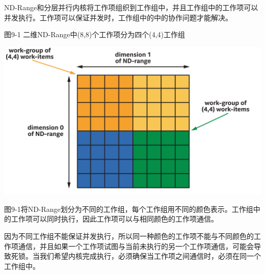 ND-Range和分层并行内核将工作项组织到工作组中，并且工作组中的工作项可以并发执行。工作项可以保证并发时，工作组中的中的协作问题才能解决。\par

\hspace*{\fill} \par %
图9-1 二维ND-Range中(8,8)个工作项分为四个(4,4)工作组
\begin{center}
	\includegraphics[width=1.\textwidth]{content/chapter-9/images/2}
\end{center}

图9-1将ND-Range划分为不同的工作组，每个工作组用不同的颜色表示。工作组中的工作项可以同时执行，因此工作项可以与相同颜色的工作项通信。\par

因为不同工作组不能保证并发执行，所以同一种颜色的工作项不能与不同颜色的工作项通信，并且如果一个工作项试图与当前未执行的另一个工作项通信，可能会导致死锁。当我们希望内核完成执行，必须确保当工作项之间通信时，必须在同一个工作组中。\par















































